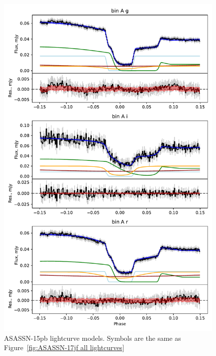 \begin{figure}
    \centering
    \includegraphics[width=\textwidth]{figures/results/ASASSN-15pb/ASASSN-15pb_1.pdf}
    \caption{ASASSN-15pb lightcurve models. Symbols are the same as Figure~\ref{fig:ASASSN-17jf all lightcurves}}
    \label{fig:ASASSN-15pb all lightcurves}
\end{figure}
